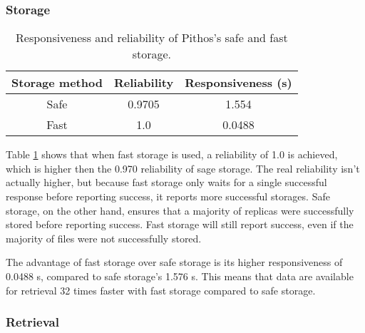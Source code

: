 \subsubsection{Storage}
\begin{table}[htbp]
\centering
\begin{tabular}{|c|c|c|}
\hline
Storage method & Reliability & Responsiveness (s)\\
\hline
Safe    &  0.9705  &   1.554  \\
Fast    &  1.0     &   0.0488 \\
\hline
\end{tabular}
\caption{Responsiveness and reliability of Pithos's safe and fast storage.}
\label{tab_pithos_storage_results}
\end{table}
%
Table \ref{tab_pithos_storage_results} shows that when fast storage is used, a reliability of 1.0 is achieved, which is higher then the 0.970 reliability of sage storage. The real reliability isn't actually higher, but because fast storage only waits for a single successful response before reporting success, it reports more successful storages. Safe storage, on the other hand, ensures that a majority of replicas were successfully stored before reporting success. Fast storage will still report success, even if the majority of files were not successfully stored.

The advantage of fast storage over safe storage is its higher responsiveness of 0.0488 s, compared to safe storage's 1.576 s. This means that data are available for retrieval 32 times faster with fast storage compared to safe storage.

\subsubsection{Retrieval}

